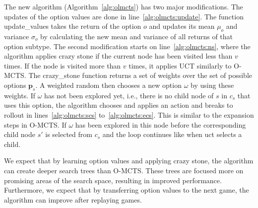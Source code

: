 The new algorithm (Algorithm~\ref{alg:olmcts}) has two major
modifications. The updates of the option values are done in
line~\ref{alg:olmcts:update}. The function \textsf{update\_values} takes the
return of the option $o$ and updates its mean $\mu_o$ and variance $\sigma_o$ by
calculating the new mean and variance of all returns of that option subtype. The
second modification starts on line~\ref{alg:olmcts:ns}, where the algorithm
applies crazy stone if the current node has been visited less than $v$ times.
If the node is visited more than $v$ times, it applies UCT similarly to
O-MCTS\@.  The \textsf{crazy\_stone} function returns a set of weights over the
set of possible options $\mathbf{p}_s$. A weighted random then chooses a new
option $\omega$ by using these weights.  If $\omega$ has not been explored yet,
i.e., there is no child node of $s$ in $c_s$ that uses this option, the
algorithm chooses and applies an action and breaks to rollout in
lines~\ref{alg:olmcts:scs} to~\ref{alg:olmcts:ecs}. This is similar to the
expansion steps in O-MCTS\@. If $\omega$ has been explored in this node before
the corresponding child node $s'$ is selected from $c_s$ and the loop continues
like when \textsf{uct} selects a child.

We expect that by learning option values and applying crazy stone, the algorithm
can create deeper search trees than O-MCTS\@. These trees are focused more on
promising areas of the search space, resulting in improved performance.
Furthermore, we expect that by transferring option values to the next game, the
algorithm can improve after replaying games.
